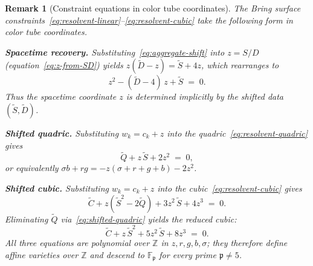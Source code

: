 \documentclass[12pt,a4paper]{report}
\newtheorem{remark}[theorem]{Remark}
\newcommand{\pp}{\mathfrak{p}}
\begin{document}
\begin{remark}[Constraint equations in color tube coordinates]
\label{rem:color-tube-constraints}
  The Bring surface constraints~\eqref{eq:resolvent-linear}--\eqref{eq:resolvent-cubic}
  take the following form in color tube coordinates.

  \medskip
  \noindent\textbf{Spacetime recovery.}\;
  Substituting~\eqref{eq:aggregate-shift} into $z = S/D$
  (equation~\eqref{eq:z-from-SD}) yields $z(\widetilde{D} - z) = \widetilde{S} + 4z$,
  which rearranges to
  \begin{equation}\label{eq:spacetime-recovery}
    z^2 - (\widetilde{D} - 4)\,z + \widetilde{S} \;=\; 0.
  \end{equation}
  Thus the spacetime coordinate $z$ is determined implicitly by the
  shifted data $(\widetilde{S}, \widetilde{D})$.

  \medskip
  \noindent\textbf{Shifted quadric.}\;
  Substituting $w_k = c_k + z$ into the quadric~\eqref{eq:resolvent-quadric}
  gives
  \begin{equation}\label{eq:shifted-quadric}
    \widetilde{Q} + z\,\widetilde{S} + 2z^2 \;=\; 0,
  \end{equation}
  or equivalently $\sigma b + rg = -z(\sigma + r + g + b) - 2z^2$.

  \medskip
  \noindent\textbf{Shifted cubic.}\;
  Substituting $w_k = c_k + z$ into the cubic~\eqref{eq:resolvent-cubic}
  gives
  \begin{equation}\label{eq:shifted-cubic}
    \widetilde{C} + z(\widetilde{S}^2 - 2\widetilde{Q})
    + 3z^2\,\widetilde{S} + 4z^3 \;=\; 0.
  \end{equation}
  Eliminating $\widetilde{Q}$ via~\eqref{eq:shifted-quadric} yields the
  \emph{reduced cubic}:
  \begin{equation}\label{eq:reduced-cubic}
    \widetilde{C} + z\,\widetilde{S}^2 + 5z^2\,\widetilde{S} + 8z^3 \;=\; 0.
  \end{equation}
  All three equations are polynomial over $\mathbb{Z}$ in $z, r, g, b, \sigma$;
  they therefore define affine varieties over $\mathbb{Z}$ and descend
  to $\mathbb{F}_\pp$ for every prime $\pp \ne 5$.
\end{remark}
\end{document}
